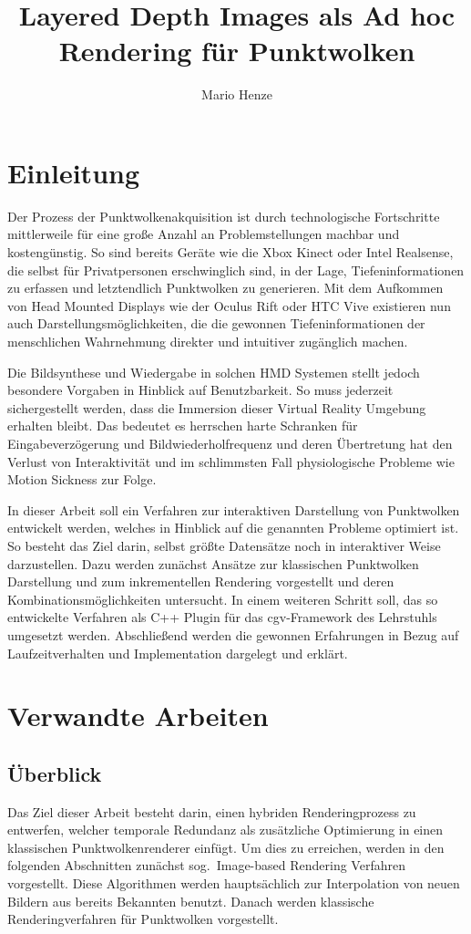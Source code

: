 \documentclass[hyperref, beleg, german]{cgvpub}
\author{Mario Henze}
\title{Layered Depth Images als Ad hoc Rendering für Punktwolken}
\begin{document}
\chapter{Einleitung}%
\label{sec:einleitung}

Der Prozess der Punktwolkenakquisition ist durch technologische Fortschritte
mittlerweile für eine große Anzahl an Problemstellungen machbar und
kostengünstig. So sind bereits Geräte wie die Xbox Kinect oder Intel
Realsense, die selbst für Privatpersonen erschwinglich sind, in der Lage,
Tiefeninformationen zu erfassen und letztendlich Punktwolken zu generieren. Mit
dem Aufkommen von Head Mounted Displays wie der Oculus Rift oder HTC Vive
existieren nun auch Darstellungsmöglichkeiten, die die gewonnen
Tiefeninformationen der menschlichen Wahrnehmung direkter und intuitiver
zugänglich machen.

Die Bildsynthese und Wiedergabe in solchen HMD Systemen stellt jedoch besondere
Vorgaben in Hinblick auf Benutzbarkeit. So muss jederzeit sichergestellt
werden, dass die Immersion dieser Virtual Reality Umgebung erhalten bleibt. Das
bedeutet es herrschen harte Schranken für Eingabeverzögerung und
Bildwiederholfrequenz und deren Übertretung hat den Verlust von Interaktivität
und im schlimmsten Fall physiologische Probleme wie Motion Sickness zur Folge.

In dieser Arbeit soll ein Verfahren zur interaktiven Darstellung von
Punktwolken entwickelt werden, welches in Hinblick auf die genannten Probleme
optimiert ist. So besteht das Ziel darin, selbst größte Datensätze noch in
interaktiver Weise darzustellen. Dazu werden zunächst Ansätze zur klassischen
Punktwolken Darstellung und zum inkrementellen Rendering vorgestellt und deren
Kombinationsmöglichkeiten untersucht. In einem weiteren Schritt soll, das so
entwickelte Verfahren als C++ Plugin für das cgv-Framework des Lehrstuhls
umgesetzt werden. Abschließend werden die gewonnen Erfahrungen in Bezug auf
Laufzeitverhalten und Implementation dargelegt und erklärt.

\chapter{Verwandte Arbeiten}%
\label{sec:verwandte_arbeiten}

\section{Überblick}

Das Ziel dieser Arbeit besteht darin, einen hybriden Renderingprozess zu
entwerfen, welcher temporale Redundanz als zusätzliche Optimierung in einen
klassischen Punktwolkenrenderer einfügt. Um dies zu erreichen, werden in den
folgenden Abschnitten zunächst sog.\ Image-based Rendering Verfahren
vorgestellt. Diese Algorithmen werden hauptsächlich zur Interpolation von neuen
Bildern aus bereits Bekannten benutzt. Danach werden klassische
Renderingverfahren für Punktwolken vorgestellt.
\end{document}
